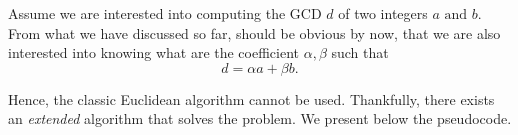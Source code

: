 \documentclass{subfiles}
\begin{document}
    Assume we are interested into computing the GCD \(d\) of two integers \(a \text{ and } b\).
        From what we have discussed so far, should be obvious by now,
        that we are also interested into knowing what are the coefficient
        \(\alpha, \beta\) such that
        \[
            d = \alpha a + \beta b.
        \]

    Hence, the classic Euclidean algorithm cannot be used. Thankfully, 
        there exists an \emph{extended} algorithm that solves the problem. 
        We present below the pseudocode.
        
\end{document}
